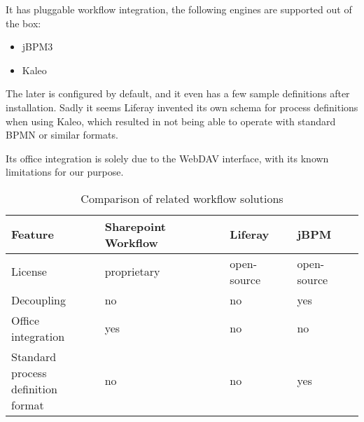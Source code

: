 It has pluggable workflow integration, the following engines are supported out of the box:

\begin{itemize}
\item jBPM3
\item Kaleo
\end{itemize}

The later is configured by default, and it even has a few sample definitions
after installation. Sadly it seems Liferay invented its own schema for process
definitions when using Kaleo\cite{liferay-kaleo}, which resulted in not being
able to operate with standard BPMN or similar formats.

Its office integration is solely due to the WebDAV interface, with its known
limitations for our purpose.

\begin{table}[H]
  \begin{center}
    \begin{tabular}{| l | l | l | l |}
    \hline
    \textbf{Feature} & \textbf{Sharepoint Workflow} & \textbf{Liferay} & \textbf{jBPM} \\ \hline
    License          & proprietary                  & open-source      & open-source \\ \hline
    Decoupling       & no                           & no               & yes \\ \hline
    Office integration & yes                        & no               & no \\ \hline
    \makecell[l]{Standard process \\ definition format} & no & no      & yes \\ \hline
    \end{tabular}
  \end{center}
  \caption{Comparison of related workflow solutions}
  \label{tab:related-wf-cmp}
\end{table}

